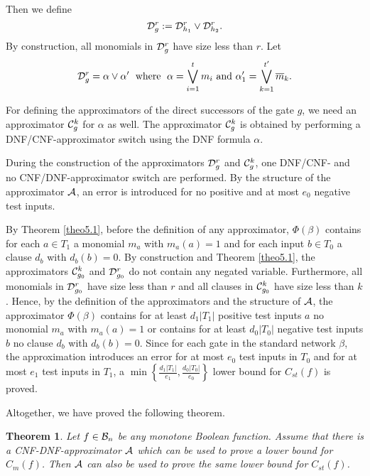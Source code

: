 \documentclass[11pt]{article}
\newtheorem{theo}{Theorem}
\begin{document}
\smallskip
Then we define
$$
{\cal D}_g^r := {\cal D}_{h_1}^r \vee {\cal D}_{h_2}^r.
$$
By construction, all monomials in ${\cal D}_g^r$ have size less than $r$. Let
$$
{\cal D}_g^r = \alpha \vee \alpha' \; \mbox{ where } \; \alpha = \bigvee_{i=1}^t m_i \mbox{ and } 
\alpha'_1 =  \bigvee_{k=1}^{t'} \overline{m}_k.
$$

For defining the approximators of the direct successors of the gate $g$, we need an approximator ${\cal C}_g^k$
for $\alpha$ as well. The approximator ${\cal C}_g^k$ is obtained by performing a DNF/CNF-approximator switch
using the DNF formula $\alpha$.

\smallskip
During the construction of the approximators ${\cal D}_g^r$ and ${\cal C}_g^k$, one DNF/CNF-
and no CNF/DNF-approximator switch are performed.
By the structure of the approximator ${\cal A}$, an error is introduced for no positive and at
most $e_0$ negative test inputs.

\smallskip
By Theorem \ref{theo5.1}, before the definition of any approximator, $\Phi(\beta)$ contains for each $a \in T_1$
a monomial $m_a$ with $m_a(a) = 1$ and for each input $b \in T_0$ a clause $d_b$ with $d_b(b) = 0$.
By construction and Theorem \ref{theo5.1}, the approximators ${\cal C}_{g_0}^k$ and ${\cal D}_{g_0}^r$ do not
contain any negated variable. Furthermore, all monomials in ${\cal D}_{g_0}^r$ have size less than $r$ and all
clauses in ${\cal C}_{g_0}^k$ have size less than $k$. Hence, by the definition of the approximators and the
structure of ${\cal A}$, the approximator $\Phi(\beta)$ contains for at least $d_1|T_1|$ positive test inputs $a$
no monomial $m_a$ with $m_a(a) = 1$ or contains for at least $d_0|T_0|$ negative test inputs $b$ no clause $d_b$
with $d_b(b) = 0$. Since for each gate in the standard network $\beta$, the approximation introduces an error for
at most $e_0$ test inputs in $T_0$ and for at most $e_1$ test inputs in $T_1$, a 
$\min\left\{\frac{d_1|T_1|}{e_1}, \frac{d_0|T_0|}{e_0}\right\}$ lower bound for $C_{st}(f)$ is proved.

\smallskip
Altogether, we have proved the following theorem.

\begin{theo} \label{theo6.1}
Let $f \in {\cal B}_n$ be any monotone Boolean function. Assume that there is a CNF-DNF-approximator ${\cal A}$
which can be used to prove a lower bound for $C_m(f)$. Then ${\cal A}$ can also be used to prove the same
lower bound for $C_{st}(f)$.
\end{theo}
\end{document}
